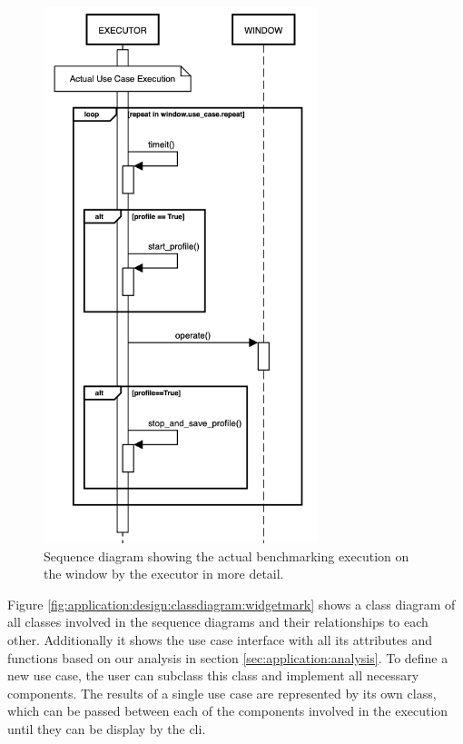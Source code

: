 \begin{figure}[h]
    \centering
    \includegraphics[width=8cm]{resources/img/sequence/executor}
    \caption{
        Sequence diagram showing the actual benchmarking execution on the window
        by the executor in more detail.
    }
    \label{fig:application:design:executor}
\end{figure}

Figure \ref{fig:application:design:classdiagram:widgetmark} shows a class
diagram of all classes involved in the sequence diagrams and their relationships
to each other. Additionally it shows the use case interface with all its
attributes and functions based on our analysis in section
\ref{sec:application:analysis}. To define a new use case, the user can subclass
this class and implement all necessary components. The results of a single use
case are represented by its own class, which can be passed between each of the
components involved in the execution until they can be display by the \gls{cli}.

